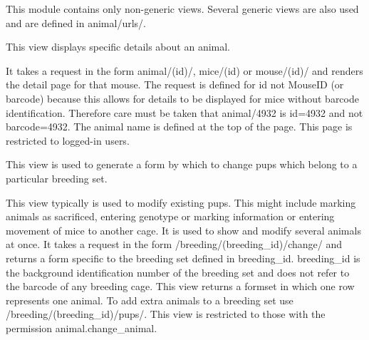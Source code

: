 \documentclass[letterpaper,10pt,english]{sphinxmanual}
\begin{document}
This module contains only non-generic views.  Several generic views are also used and are defined in animal/urls/.


\begin{fulllineitems}
\label{api:animal.views.animal_detail}
This view displays specific details about an animal.

It takes a request in the form animal/(id)/, mice/(id) or mouse/(id)/ and renders the detail page for that mouse.  The request is defined for id not MouseID (or barcode) because this allows for details to be displayed for mice without barcode identification.
Therefore care must be taken that animal/4932 is id=4932 and not barcode=4932.  The animal name is defined at the top of the page.
This page is restricted to logged-in users.

\end{fulllineitems}



\begin{fulllineitems}
\label{api:animal.views.breeding_change}
This view is used to generate a form by which to change pups which belong to a particular breeding set.

This view typically is used to modify existing pups.  This might include marking animals as sacrificed, entering genotype or marking information or entering movement of mice to another cage.  It is used to show and modify several animals at once.
It takes a request in the form /breeding/(breeding\_id)/change/ and returns a form specific to the breeding set defined in breeding\_id.  breeding\_id is the background identification number of the breeding set and does not refer to the barcode of any breeding cage.
This view returns a formset in which one row represents one animal.  To add extra animals to a breeding set use /breeding/(breeding\_id)/pups/.
This view is restricted to those with the permission animal.change\_animal.

\end{fulllineitems}


\end{document}
